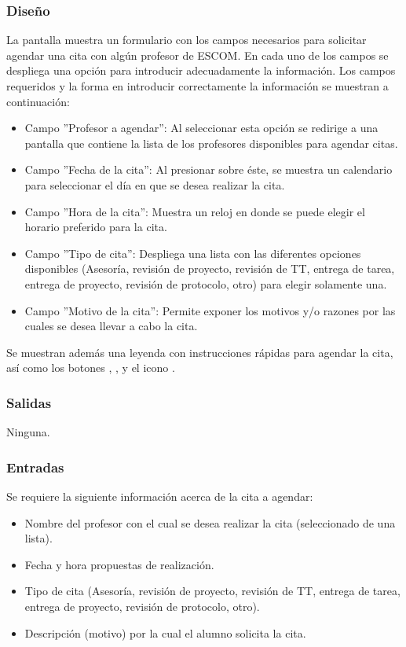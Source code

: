 \subsubsection{Diseño}
	\noindent
	La pantalla muestra un formulario con los campos necesarios para solicitar agendar una cita con algún profesor de ESCOM. En cada uno de los campos se despliega una opción para introducir adecuadamente la información. Los campos requeridos y la forma en introducir correctamente la información se muestran a continuación: 
	\begin{itemize}
		\item Campo ''Profesor a agendar'': Al seleccionar esta opción se redirige a una pantalla que contiene la lista de los profesores disponibles para agendar citas.
		\item Campo ''Fecha de la cita'': Al presionar sobre éste, se muestra un calendario para seleccionar el día en que se desea realizar la cita.
		\item Campo ''Hora de la cita'': Muestra un reloj en donde se puede elegir el horario preferido para la cita.	
		\item Campo ''Tipo de cita'': Despliega una lista con las diferentes opciones disponibles (Asesoría, revisión de proyecto, revisión de TT, entrega de tarea, entrega de proyecto, revisión de protocolo, otro) para elegir solamente una. 
		\item Campo ''Motivo de la cita'': Permite exponer los motivos y/o razones por las cuales se desea llevar a cabo la cita.
	\end{itemize}
	Se muestran además una leyenda con instrucciones rápidas para agendar la cita, así como los botones , , y el icono .

\pagebreak
{}

\subsubsection{Salidas}
	\noindent
	Ninguna.

\subsubsection{Entradas}
	Se requiere la siguiente información acerca de la cita a agendar:
	\begin{itemize}
		\item Nombre del profesor con el cual se desea realizar la cita (seleccionado de una lista).
		\item Fecha y hora propuestas de realización.
		\item Tipo de cita (Asesoría, revisión de proyecto, revisión de TT, entrega de tarea, entrega de proyecto, revisión de protocolo, otro).
		\item Descripción (motivo) por la cual el alumno solicita la cita.
	\end{itemize}

